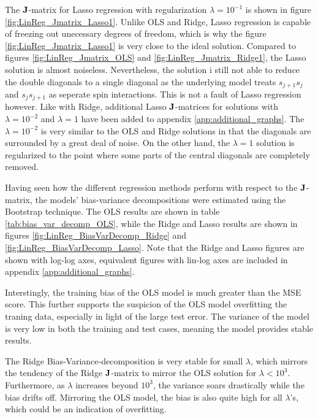 \documentclass[nofootinbib,reprint,english]{revtex4-1}
\begin{document}
The \(\vb{J}\)-matrix for Lasso regression with regularization \(\lambda=10^{-1}\) is shown in figure \ref{fig:LinReg_Jmatrix_Lasso1}. Unlike OLS and Ridge, Lasso regression is capable of freezing out unecessary degrees of freedom, which is why the figure \ref{fig:LinReg_Jmatrix_Lasso1} is very close to the ideal solution. Compared to figures \ref{fig:LinReg_Jmatrix_OLS} and \ref{fig:LinReg_Jmatrix_Ridge1}, the Lasso solution is almost noiseless. Nevertheless, the solution i still not able to reduce the double diagonals to a single diagonal as the underlying model treats \(s_{j+1}s_j\) and \(s_js_{j+1}\) as seperate spin interactions. This is not a fault of Lasso regression however. Like with Ridge, additional Lasso \(\vb{J}\)-matrices for solutions with \(\lambda=10^{-2}\) and \(\lambda=1\) have been added to appendix \eqref{app:additional_graphs}. The \(\lambda=10^{-2}\) is very similar to the OLS and Ridge solutions in that the diagonals are surrounded by a great deal of noise. On the other hand, the \(\lambda=1\) solution is regularized to the point where some parts of the central diagonals are completely removed.

Having seen how the different regression methods perform with respect to the \(\vb{J}\)-matrix, the models' bias-variance decompositions were estimated using the Bootstrap technique. The OLS results are shown in table \ref{tab:bias_var_decomp_OLS}, while the Ridge and Lasso results are shown in figures \ref{fig:LinReg_BiasVarDecomp_Ridge} and \ref{fig:LinReg_BiasVarDecomp_Lasso}. Note that the Ridge and Lasso figures are shown with log-log axes, equivalent figures with lin-log axes are included in appendix \ref{app:additional_graphs}.

Interstingly, the training bias of the OLS model is much greater than the MSE score. This further supports the suspicion of the OLS model overfitting the traning data, especially in light of the large test error. The variance of the model is very low in both the training and test cases, meaning the model provides stable results.

The Ridge Bias-Variance-decomposition is very stable for small \(\lambda\), which mirrors the tendency of the Ridge \(\vb{J}\)-matrix to mirror the OLS solution for \(\lambda<10^3\). Furthermore, as \(\lambda\) increases beyond \(10^3\), the variance soars drastically while the bias drifts off. Mirroring the OLS model, the bias is also quite high for all \(\lambda\)'s, which could be an indication of overfitting.
\end{document}
